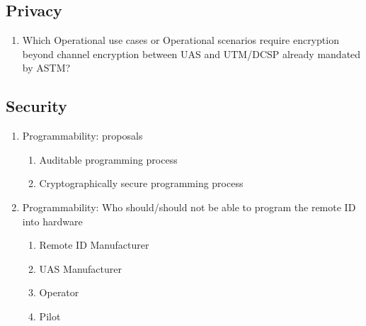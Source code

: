 \documentclass{ua_wgs_questionnaire}
\begin{document}
\begin{Form}[action={http://localhost:8000}, encoding=html, method=post]
\subsection{Privacy}
\begin{enumerate}
\item Which Operational use cases
or Operational scenarios
require encryption beyond channel
encryption between UAS and UTM/DCSP already mandated by ASTM?
\end{enumerate}

\subsection{Security}
\begin{enumerate}
\item Programmability: proposals
\begin{enumerate}
\item Auditable programming process
\item Cryptographically secure programming process
\end{enumerate}
\item Programmability: Who should/should not be able to program the remote
ID into hardware
\begin{enumerate}
\item Remote ID Manufacturer
\item UAS Manufacturer
\item Operator
\item Pilot
\end{enumerate}
\end{enumerate}


\end{Form}
\end{document}
